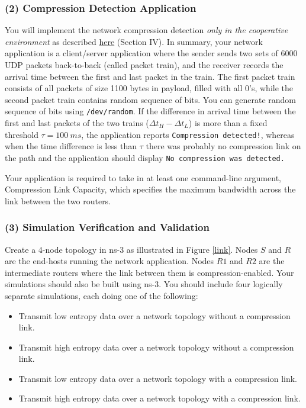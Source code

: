 \documentclass[10pt]{article}
\begin{document}
\subsubsection{(2) Compression Detection Application}
You will implement the network compression detection \emph{only in the cooperative environment} as described \href{https://lasr.cs.ucla.edu/vahab/resources/compression_detection.pdf}{here} (Section IV). In summary, your network application is a client/server application where the sender sends two sets of 6000 UDP packets back-to-back (called packet train), and the receiver records the arrival time between the first and last packet in the train. The first packet train consists of all packets of size 1100 bytes in payload, filled with all 0's, while the second packet train contains random sequence of bits. You can generate random sequence of bits using \texttt{/dev/random}. If the difference in arrival time between the first and last packets of the two trains ($\Delta t_H - \Delta t_L$) is more than a fixed threshold $\tau = 100~ms$, the application reports \texttt{Compression detected!}, whereas when the time difference is less than $\tau$ there was probably no compression link on the path and the application should display \texttt{No compression was detected.}

Your application is required to take in at least one command-line argument, Compression Link Capacity, which specifies the maximum bandwidth across the link between the two routers.

\subsubsection{(3) Simulation Verification and Validation}

Create a 4-node topology in ns-3 as illustrated in Figure \ref{link}. Nodes $S$ and $R$ are the end-hosts running the network application. Nodes $R1$ and $R2$ are the intermediate routers where the link between them is compression-enabled. Your simulations should also be built using ns-3.  You should include four logically separate simulations, each doing one of the following:

\begin{itemize}
    \item Transmit low entropy data over a network topology without a compression link.
    \item Transmit high entropy data over a network topology without a compression link.
    \item Transmit low entropy data over a network topology with a compression link.
    \item Transmit high entropy data over a network topology with a compression link.
\end{itemize}
\end{document}
